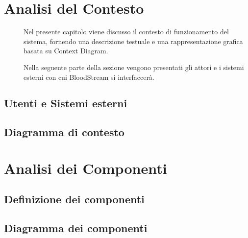 \documentclass{article}
\begin{document}
\clearpage


\section{Analisi del Contesto}
\begin{description}
    \item[] Nel presente capitolo viene discusso il contesto di funzionamento del sistema, fornendo una descrizione testuale e una rappresentazione grafica basata su Context Diagram.

    Nella seguente parte della sezione vengono presentati gli attori e i sistemi esterni con cui BloodStream si interfaccerà. 
\end{description}

\subsection{Utenti e Sistemi esterni}
\subsection{Diagramma di contesto}
\clearpage

\section{Analisi dei Componenti}
\subsection{Definizione dei componenti}

\subsection{Diagramma dei componenti}
\end{document}

